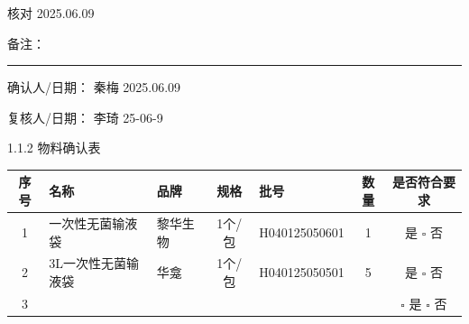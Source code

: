 \documentclass[UTF8,10pt,a4paper,fontset=fandol]{ctexart}
\newcommand{\fieldvalue}[1]{#1}
\newcommand{\handwritten}[1]{#1}
\begin{document}
\handwritten{核对 2025.06.09}

备注：\rule{0.75\textwidth}{0.4pt}

确认人/日期：
\fieldvalue{\handwritten{秦梅}}
\quad
\fieldvalue{\handwritten{2025.06.09}}

\hfill
复核人/日期：
\fieldvalue{\handwritten{李琦}}
\quad
\fieldvalue{\handwritten{25-06-9}}

\vspace{0.5em}

1.1.2 物料确认表

\small
\begin{tabularx}{\textwidth}{|c|X|X|c|X|c|c|}
\hline
序号 & 名称 & 品牌 & 规格 & 批号 & 数量 & 是否符合要求 \\
\hline
1 & 一次性无菌输液袋 &
\fieldvalue{\handwritten{黎华生物}} &
1个/包 &
\fieldvalue{\handwritten{H040125050601}} &
\fieldvalue{\handwritten{1}} &
\fieldvalue{是} \quad $\square$ 否 \\
\hline
2 &
\fieldvalue{\handwritten{3L一次性无菌输液袋}} &
\fieldvalue{\handwritten{华龛}} &
\fieldvalue{\handwritten{1个/包}} &
\fieldvalue{\handwritten{H040125050501}} &
\fieldvalue{\handwritten{5}} &
\fieldvalue{是} \quad $\square$ 否 \\
\hline
3 & & & & & & $\square$ 是 \quad $\square$ 否 \\
\hline
\end{tabularx}
\normalsize
\end{document}

